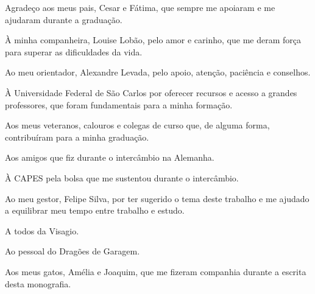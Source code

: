 \begin{agradecimentos}
    Agradeço aos meus pais, Cesar e Fátima, que sempre me apoiaram e me ajudaram durante a graduação.
    
    À minha companheira, Louise Lobão, pelo amor e carinho, que me deram força para superar as dificuldades da vida.
    
    Ao meu orientador, Alexandre Levada, pelo apoio, atenção, paciência e conselhos.
    
    À Universidade Federal de São Carlos por oferecer recursos e acesso a grandes professores, que foram fundamentais para a minha formação.
    
    Aos meus veteranos, calouros e colegas de curso que, de alguma forma, contribuíram para a minha graduação.
    
    Aos amigos que fiz durante o intercâmbio na Alemanha.
    
    À CAPES pela bolsa que me sustentou durante o intercâmbio.
    
    Ao meu gestor, Felipe Silva, por ter sugerido o tema deste trabalho e me ajudado a equilibrar meu tempo entre trabalho e estudo.
    
    A todos da Visagio.
    
    Ao pessoal do Dragões de Garagem.
    
    Aos meus gatos, Amélia e Joaquim, que me fizeram companhia durante a escrita desta monografia.
\end{agradecimentos}
